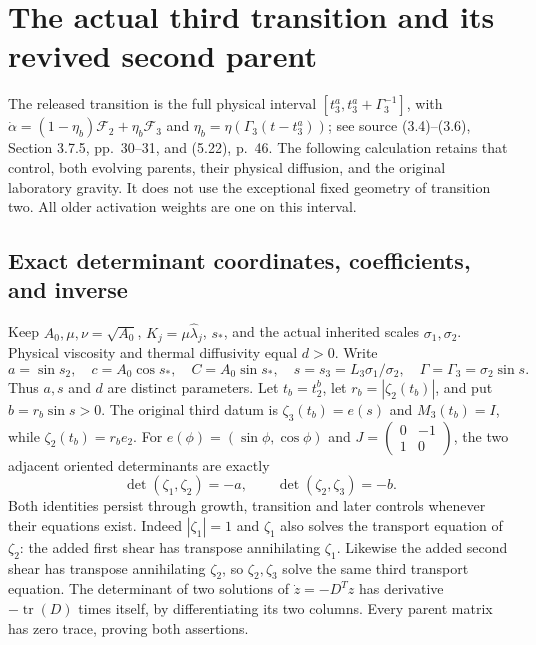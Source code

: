 \section{The actual third transition and its revived second parent}
\label{tt:section}

The released transition is the full physical interval
$[t_3^a,t_3^a+\Gamma_3^{-1}]$, with
$\dot\alpha=(1-\eta_b)\mathcal F_2+\eta_b\mathcal F_3$ and
$\eta_b=\eta(\Gamma_3(t-t_3^a))$; see source (3.4)--(3.6),
Section 3.7.5, pp.~30--31, and (5.22), p.~46.
The following calculation retains that control, both evolving parents,
their physical diffusion, and the original laboratory gravity.
It does not use the exceptional fixed geometry of transition two.
All older activation weights are one on this interval.

\subsection{Exact determinant coordinates, coefficients, and inverse}

Keep $A_0,\mu,\nu=\sqrt{A_0}$, $K_j=\mu\widehat\lambda_j$,
$s_*$, and the actual inherited scales $\sigma_1,\sigma_2$.
Physical viscosity and thermal diffusivity equal $d>0$.
Write
\begin{equation}\label{tt:constants}
 a=\sin s_2,\quad c=A_0\cos s_*,\quad C=A_0\sin s_*,
 \quad s=s_3=L_3\sigma_1/\sigma_2,\quad
 \Gamma=\Gamma_3=\sigma_2\sin s.
\end{equation}
Thus $a,s$ and $d$ are distinct parameters. Let $t_b=t_2^b$,
let $r_b=|\zeta_2(t_b)|$, and put $b=r_b\sin s>0$.
The original third datum is $\zeta_3(t_b)=e(s)$ and
$M_3(t_b)=I$, while $\zeta_2(t_b)=r_be_2$.
For $e(\phi)=(\sin\phi,\cos\phi)$ and
$J=\left(\begin{smallmatrix}0&-1\\1&0\end{smallmatrix}\right)$,
the two adjacent oriented determinants are exactly
\begin{equation}\label{tt:determinants}
 \det(\zeta_1,\zeta_2)=-a,\qquad
 \det(\zeta_2,\zeta_3)=-b.
\end{equation}
Both identities persist through growth, transition and later controls
whenever their equations exist. Indeed $|\zeta_1|=1$ and
$\zeta_1$ also solves the transport equation of $\zeta_2$:
the added first shear has transpose annihilating $\zeta_1$.
Likewise the added second shear has transpose annihilating $\zeta_2$,
so $\zeta_2,\zeta_3$ solve the same third transport equation.
The determinant of two solutions of $\dot z=-D^Tz$ has derivative
$-\operatorname{tr}(D)$ times itself, by differentiating its two
columns. Every parent matrix has zero trace, proving both assertions.

